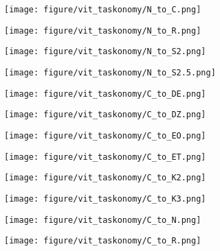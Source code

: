 \begin{figure}[h]\ContinuedFloat
\centering
\begin{subfigure}{\figlength\textwidth}
\texttt{[image: figure/vit\_taskonomy/N\_to\_C.png]}
\end{subfigure}
\begin{subfigure}{\figlength\textwidth}
\texttt{[image: figure/vit\_taskonomy/N\_to\_R.png]}
\end{subfigure}
\begin{subfigure}{\figlength\textwidth}
\texttt{[image: figure/vit\_taskonomy/N\_to\_S2.png]}
\end{subfigure}
\begin{subfigure}{\figlength\textwidth}
\texttt{[image: figure/vit\_taskonomy/N\_to\_S2.5.png]}
\end{subfigure}
\begin{subfigure}{\figlength\textwidth}
\texttt{[image: figure/vit\_taskonomy/C\_to\_DE.png]}
\end{subfigure}
\begin{subfigure}{\figlength\textwidth}
\texttt{[image: figure/vit\_taskonomy/C\_to\_DZ.png]}
\end{subfigure}
\begin{subfigure}{\figlength\textwidth}
\texttt{[image: figure/vit\_taskonomy/C\_to\_EO.png]}
\end{subfigure}
\begin{subfigure}{\figlength\textwidth}
\texttt{[image: figure/vit\_taskonomy/C\_to\_ET.png]}
\end{subfigure}
\begin{subfigure}{\figlength\textwidth}
\texttt{[image: figure/vit\_taskonomy/C\_to\_K2.png]}
\end{subfigure}
\begin{subfigure}{\figlength\textwidth}
\texttt{[image: figure/vit\_taskonomy/C\_to\_K3.png]}
\end{subfigure}
\begin{subfigure}{\figlength\textwidth}
\texttt{[image: figure/vit\_taskonomy/C\_to\_N.png]}
\end{subfigure}
\begin{subfigure}{\figlength\textwidth}
\texttt{[image: figure/vit\_taskonomy/C\_to\_R.png]}
\end{subfigure}
\begin{subfigure}{\figlength\textwidth}

\end{subfigure}
\end{figure}
